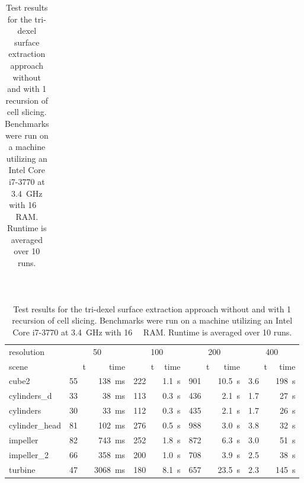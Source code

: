\begin{table}
\begin{subtable}{\textwidth}
\begin{tabular}{l|rr|rr|rr|rr}
		\end{tabular}
		\caption{
			Without cell slicing.
		}
		\label{tbl:tri_dexel_results_no_slicing}
	\end{subtable}
	\bigskip\\
	\begin{subtable}{\textwidth}
		\centering
		\begin{tabular}{l|rr|rr|rr|rr}
			resolution     & \multicolumn{2}{c}{50} & \multicolumn{2}{c}{100} & \multicolumn{2}{c}{200} & \multicolumn{2}{c}{400} \\
			scene          & t\sub{out} & time & t\sub{out} & time & t\sub{out} & time & t\sub{out} & time \\
			\midrule
			cube2          & \SI{55}{\kilo\nothing} & \SI{ 138}{\milli\second} & \SI{222}{\kilo\nothing} & \SI{1.1}{\second} & \SI{901}{\kilo\nothing} & \SI{10.5}{\second} & \SI{3.6}{\mega\nothing} & \SI{198}{\second} \\
			cylinders\_d   & \SI{33}{\kilo\nothing} & \SI{  38}{\milli\second} & \SI{113}{\kilo\nothing} & \SI{0.3}{\second} & \SI{436}{\kilo\nothing} & \SI{ 2.1}{\second} & \SI{1.7}{\mega\nothing} & \SI{ 27}{\second} \\
			cylinders      & \SI{30}{\kilo\nothing} & \SI{  33}{\milli\second} & \SI{112}{\kilo\nothing} & \SI{0.3}{\second} & \SI{435}{\kilo\nothing} & \SI{ 2.1}{\second} & \SI{1.7}{\mega\nothing} & \SI{ 26}{\second} \\
			cylinder\_head & \SI{81}{\kilo\nothing} & \SI{ 102}{\milli\second} & \SI{276}{\kilo\nothing} & \SI{0.5}{\second} & \SI{988}{\kilo\nothing} & \SI{ 3.0}{\second} & \SI{3.8}{\mega\nothing} & \SI{ 32}{\second} \\
			impeller       & \SI{82}{\kilo\nothing} & \SI{ 743}{\milli\second} & \SI{252}{\kilo\nothing} & \SI{1.8}{\second} & \SI{872}{\kilo\nothing} & \SI{ 6.3}{\second} & \SI{3.0}{\mega\nothing} & \SI{ 51}{\second} \\
			impeller\_2    & \SI{66}{\kilo\nothing} & \SI{ 358}{\milli\second} & \SI{200}{\kilo\nothing} & \SI{1.0}{\second} & \SI{708}{\kilo\nothing} & \SI{ 3.9}{\second} & \SI{2.5}{\mega\nothing} & \SI{ 38}{\second} \\
			turbine        & \SI{47}{\kilo\nothing} & \SI{3068}{\milli\second} & \SI{180}{\kilo\nothing} & \SI{8.1}{\second} & \SI{657}{\kilo\nothing} & \SI{23.5}{\second} & \SI{2.3}{\mega\nothing} & \SI{145}{\second} \\
		\end{tabular}
		\caption{
			With cell slicing.
		}
		\label{tbl:tri_dexel_results_slicing}
	\end{subtable}
	\caption{
		Test results for the tri-dexel surface extraction approach without and with 1 recursion of cell slicing.
		Benchmarks were run on a machine utilizing an Intel Core i7-3770 at \SI{3.4}{\giga\hertz} with \SI{16}{\gibi\byte} RAM.
		Runtime is averaged over 10 runs.
	}
	\label{tbl:tri_dexel_results}
\end{table}
